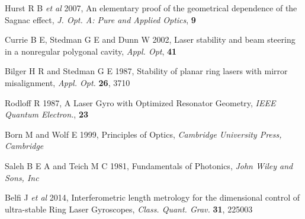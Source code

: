 \documentclass[12pt,a4paper,final]{iopart}
\begin{document}
\begin{thebibliography}{10}
 Hurst R B \textit{et al} 2007, An elementary
proof of the geometrical dependence of the Sagnac effect, 
\textit{J. Opt. A: Pure and Applied Optics}, \textbf{9}

 Currie B E, Stedman G E and Dunn W 2002, Laser stability and beam steering 
in a nonregular polygonal cavity, \textit{Appl. Opt}, \textbf{41}

 Bilger H R and Stedman G E 1987, Stability of planar ring lasers 
with mirror misalignment, \textit{Appl. Opt.} \textbf{26}, 3710

 Rodloff R 1987, A Laser Gyro with Optimized Resonator Geometry, 
\textit{IEEE Quantum Electron.}, \textbf{23}

 Born M and Wolf E 1999, Principles of Optics, 
\textit{Cambridge University Press, Cambridge}

 Saleh B E A and Teich M C 1981, Fundamentals of Photonics, 
\textit{John Wiley and Sons, Inc} 

 Belfi J \textit{et al} 2014, Interferometric length metrology
for the dimensional control of ultra-stable Ring Laser Gyroscopes, \textit {Class. Quant. Grav.} \textbf{31}, 225003

\end{thebibliography}
\end{document}
